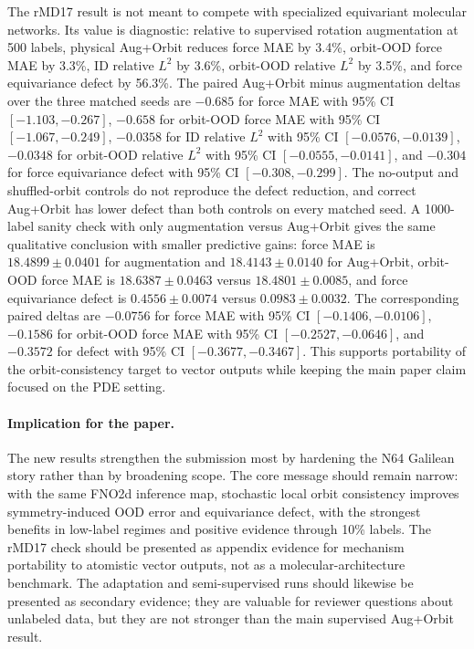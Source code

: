 The rMD17 result is not meant to compete with specialized equivariant molecular networks. Its value is diagnostic: relative to supervised rotation augmentation at 500 labels, physical Aug+Orbit reduces force MAE by 3.4\%, orbit-OOD force MAE by 3.3\%, ID relative \(L^2\) by 3.6\%, orbit-OOD relative \(L^2\) by 3.5\%, and force equivariance defect by 56.3\%. The paired Aug+Orbit minus augmentation deltas over the three matched seeds are \(-0.685\) for force MAE with 95\% CI \([-1.103,-0.267]\), \(-0.658\) for orbit-OOD force MAE with 95\% CI \([-1.067,-0.249]\), \(-0.0358\) for ID relative \(L^2\) with 95\% CI \([-0.0576,-0.0139]\), \(-0.0348\) for orbit-OOD relative \(L^2\) with 95\% CI \([-0.0555,-0.0141]\), and \(-0.304\) for force equivariance defect with 95\% CI \([-0.308,-0.299]\). The no-output and shuffled-orbit controls do not reproduce the defect reduction, and correct Aug+Orbit has lower defect than both controls on every matched seed. A 1000-label sanity check with only augmentation versus Aug+Orbit gives the same qualitative conclusion with smaller predictive gains: force MAE is \(18.4899\pm0.0401\) for augmentation and \(18.4143\pm0.0140\) for Aug+Orbit, orbit-OOD force MAE is \(18.6387\pm0.0463\) versus \(18.4801\pm0.0085\), and force equivariance defect is \(0.4556\pm0.0074\) versus \(0.0983\pm0.0032\). The corresponding paired deltas are \(-0.0756\) for force MAE with 95\% CI \([-0.1406,-0.0106]\), \(-0.1586\) for orbit-OOD force MAE with 95\% CI \([-0.2527,-0.0646]\), and \(-0.3572\) for defect with 95\% CI \([-0.3677,-0.3467]\). This supports portability of the orbit-consistency target to vector outputs while keeping the main paper claim focused on the PDE setting.

\paragraph{Implication for the paper.} The new results strengthen the submission most by hardening the N64 Galilean story rather than by broadening scope. The core message should remain narrow: with the same FNO2d inference map, stochastic local orbit consistency improves symmetry-induced OOD error and equivariance defect, with the strongest benefits in low-label regimes and positive evidence through 10\% labels. The rMD17 check should be presented as appendix evidence for mechanism portability to atomistic vector outputs, not as a molecular-architecture benchmark. The adaptation and semi-supervised runs should likewise be presented as secondary evidence; they are valuable for reviewer questions about unlabeled data, but they are not stronger than the main supervised Aug+Orbit result.
